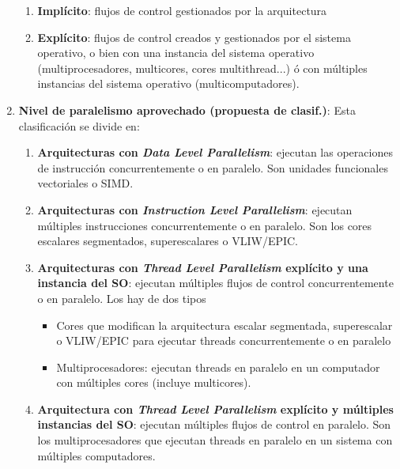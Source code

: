 \documentclass[10pt,a4paper,spanish]{report}
\begin{document}
\begin{enumerate}[\color{azul}{\bf $\heartsuit$}]
\begin{enumerate}[$\longrightarrow$]
\item \textbf{\textcolor[rgb]{0.2,0.4,0.8}{Implícito}}: flujos de control gestionados por la arquitectura
\item \textbf{\textcolor[rgb]{0.2,0.4,0.8}{Explícito}}: flujos de control creados y gestionados por el sistema operativo, o bien con una instancia del sistema operativo (multiprocesadores, multicores, cores multithread...) ó con múltiples instancias del sistema operativo (multicomputadores).
\end{enumerate}
\item \textbf{\textcolor[rgb]{0.2,0.4,0.8}{Nivel de paralelismo aprovechado (propuesta de clasif.)}}: Esta clasificación se divide en:
\begin{enumerate}[$\longrightarrow$]
\item \textbf{\textcolor[rgb]{0.2,0.4,0.8}{Arquitecturas con \textit{Data Level Parallelism}}}: ejecutan las operaciones de instrucción concurrentemente o en paralelo. Son unidades funcionales vectoriales o SIMD.
\item \textbf{\textcolor[rgb]{0.2,0.4,0.8}{Arquitecturas con \textit{Instruction Level Parallelism}}}: ejecutan múltiples instrucciones concurrentemente o en paralelo. Son los cores escalares segmentados, superescalares o VLIW/EPIC.
\item \textbf{\textcolor[rgb]{0.2,0.4,0.8}{Arquitecturas con \textit{Thread Level Parallelism} explícito y una instancia del SO}}: ejecutan múltiples flujos de control concurrentemente o en paralelo. Los hay de dos tipos
\begin{itemize}
   \item Cores que modifican la arquitectura escalar segmentada, superescalar o VLIW/EPIC para ejecutar threads concurrentemente o en paralelo
   \item Multiprocesadores: ejecutan threads en paralelo en un computador con múltiples cores (incluye multicores).
 \end{itemize}
 \item \textbf{\textcolor[rgb]{0.2,0.4,0.8}{Arquitectura con \textit{Thread Level Parallelism} explícito y múltiples instancias del SO}}: ejecutan múltiples flujos de control en paralelo. Son los multiprocesadores que ejecutan threads en paralelo en un sistema con múltiples computadores.
\end{enumerate}
\end{enumerate}
\end{document}
